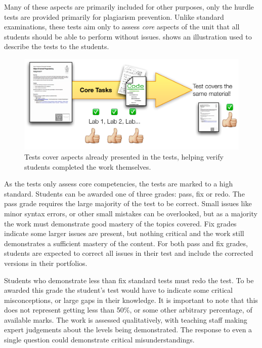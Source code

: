 Many of these aspects are primarily included for other purposes, only the hurdle tests are provided primarily for plagiarism prevention. Unlike standard examinations, these tests aim only to assess \emph{core} aspects of the unit that all students should be able to perform without issues.  shows an illustration used to describe the tests to the students.

\begin{figure}[htbp]
	\centering
	\includegraphics[width=\textwidth]{Tests}
	\caption{Tests cover aspects already presented in the tests, helping verify students completed the work themselves.}
	\label{fig:tests}
\end{figure}

As the tests only assess core competencies, the tests are marked to a high standard. Students can be awarded one of three grades: pass, fix or redo. The pass grade requires the large majority of the test to be correct. Small issues like minor syntax errors, or other small mistakes can be overlooked, but as a majority the work must demonstrate good mastery of the topics covered. Fix grades indicate some larger issues are present, but nothing critical and the work still demonstrates a sufficient mastery of the content. For both pass and fix grades, students are expected to correct all issues in their test and include the corrected versions in their portfolios. 

Students who demonstrate less than fix standard tests must redo the test. To be awarded this grade the student's test would have to indicate some critical misconceptions, or large gaps in their knowledge. It is important to note that this does not represent getting less than 50\%, or some other arbitrary percentage, of available marks. The work is assessed qualitatively, with teaching staff making expert judgements about the levels being demonstrated. The response to even a single question could demonstrate critical misunderstandings.

